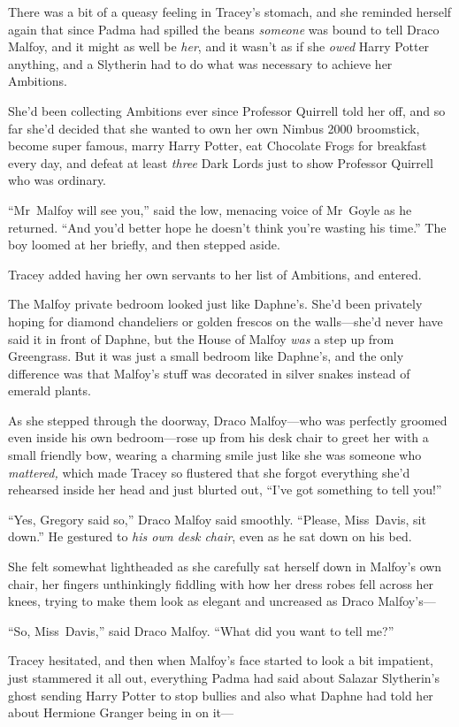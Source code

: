 There was a bit of a queasy feeling in Tracey’s stomach, and she reminded
herself again that since Padma had spilled the beans \emph{someone} was bound
to tell Draco Malfoy, and it might as well be \emph{her}, and it wasn’t as if
she \emph{owed} Harry Potter anything, and a Slytherin had to do what was
necessary to achieve her Ambitions.

She’d been collecting Ambitions ever since Professor Quirrell told her off, and
so far she’d decided that she wanted to own her own Nimbus 2000 broomstick,
become super famous, marry Harry Potter, eat Chocolate Frogs for breakfast
every day, and defeat at least \emph{three} Dark Lords just to show Professor
Quirrell who was ordinary.

“Mr~Malfoy will see you,” said the low, menacing voice of Mr~Goyle as he
returned. “And you’d better hope he doesn’t think you’re wasting his time.” The
boy loomed at her briefly, and then stepped aside.

Tracey added having her own servants to her list of Ambitions, and entered.

The Malfoy private bedroom looked just like Daphne’s. She’d been privately
hoping for diamond chandeliers or golden frescos on the walls—she’d never
have said it in front of Daphne, but the House of Malfoy \emph{was} a step up
from Greengrass. But it was just a small bedroom like Daphne’s, and the only
difference was that Malfoy’s stuff was decorated in silver snakes instead of
emerald plants.

As she stepped through the doorway, Draco Malfoy—who was perfectly groomed
even inside his own bedroom—rose up from his desk chair to greet her with a
small friendly bow, wearing a charming smile just like she was someone who
\emph{mattered,} which made Tracey so flustered that she forgot everything
she’d rehearsed inside her head and just blurted out, “I’ve got something to
tell you!”

“Yes, Gregory said so,” Draco Malfoy said smoothly. “Please, Miss~Davis, sit
down.” He gestured to \emph{his own desk chair}, even as he sat down on his bed.

She felt somewhat lightheaded as she carefully sat herself down in Malfoy’s own
chair, her fingers unthinkingly fiddling with how her dress robes fell across
her knees, trying to make them look as elegant and uncreased as Draco
Malfoy’s—

“So, Miss~Davis,” said Draco Malfoy. “What did you want to tell me?”

Tracey hesitated, and then when Malfoy’s face started to look a bit impatient,
just stammered it all out, everything Padma had said about Salazar Slytherin’s
ghost sending Harry Potter to stop bullies and also what Daphne had told her
about Hermione Granger being in on it—

